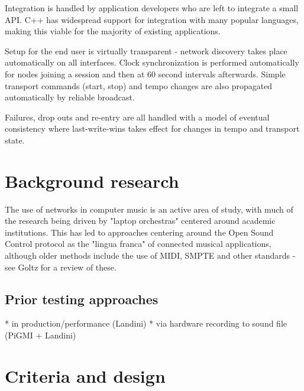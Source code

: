 \documentclass[11pt]{article} %
\theoremstyle{plain}
\theoremstyle{definition}
\begin{document}
Integration is handled by application developers who are left to integrate a
small API. C++ has widespread support for integration with many popular
languages, making this viable for the majority of existing applications.

Setup for the end user is virtually transparent - network discovery takes place
automatically on all interfaces. Clock synchronization is performed
automatically for nodes joining a session and then at 60 second intervals
afterwards. Simple transport commands (start, stop) and tempo changes are also
propagated automatically by reliable broadcast.

Failures, drop outs and re-entry are all handled with a model of eventual
consistency where last-write-wins takes effect for changes in tempo and
transport state.

\section{Background research}

The use of networks in computer music is an active area of study, with much of
the research being driven by "laptop orchestras"\cite{trueman2007laptop}
centered around academic institutions. This has led to approaches centering
around the Open Sound Control
protocol\cite{wright2005open}\cite{madgwick2015simple}\cite{narveson2013landini}
as the "lingua franca" of connected musical applications, although older
methods include the use of MIDI, SMPTE and other standards - see
Goltz\cite{goltz2018ableton} for a review of these.

\subsection{Prior testing approaches}


* in production/performance (Landini)
* via hardware recording to sound file (PiGMI + Landini)

\section{Criteria and design}
\end{document}
